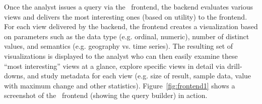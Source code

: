 Once the analyst issues a query via the \VizRecDB\ frontend, the backend
evaluates various views and delivers the most interesting ones (based on
utility) to the frontend.
For each view delivered by the backend, the frontend creates a visualization
based on parameters such as the data
type (e.g. ordinal, numeric), number of distinct values, and semantics (e.g.
geography vs. time series).
The resulting set of visualizations is displayed to the analyst who can then
easily examine these ``most interesting'' views at a glance, explore specific views in
detail via drill-downs, 
and study metadata for each view (e.g. size of result, sample data, value with
maximum change and other statistics). 
Figure~\ref{fig:frontend1} shows a screenshot of the \VizRecDB\ frontend (showing
the query builder) in action.
 
